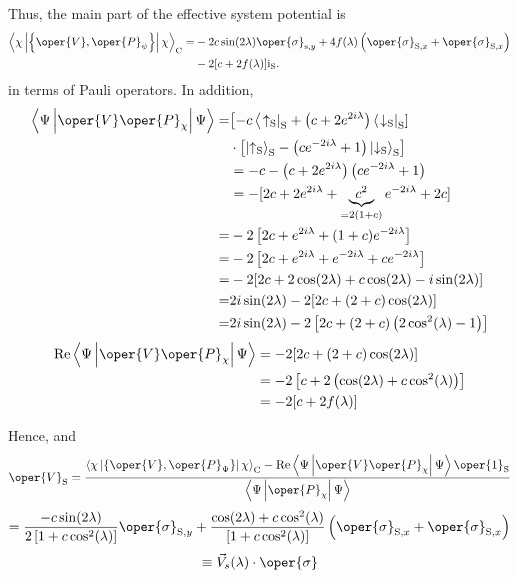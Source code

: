 Thus, the main part of the effective system potential is
$$
\begin{aligned}
\left\langle\chi\left|\left\{\oper{V}, \oper{P}_\psi\right\}\right| \chi\right\rangle_{\mathrm{C}}= & -2 c \sin (2 \lambda) \oper{\sigma}_{\mathrm{s}, y}+4 f(\lambda)\left(\oper{\sigma}_{\mathrm{S}, x}+\oper{\sigma}_{\mathrm{S}, x}\right) \\
& -2[c+2 f(\lambda)] \mathrm{i}_{\mathrm{S}} .
\end{aligned}
$$
in terms of Pauli operators. In addition,
$$
\begin{aligned}
\left\langle\Psi\left|\oper{V} \oper{P}_\chi\right| \Psi\right\rangle= & {\left[-c\left\langle\left.\uparrow_{\mathrm{S}}\right|_{\mathrm{S}}+\left(c+2 e^{2 i \lambda}\right)\left\langle\left.\downarrow_{\mathrm{S}}\right|_{\mathrm{S}}\right]\right.\right.} \\
& \cdot\left[\left|\uparrow_{\mathrm{S}}\right\rangle_{\mathrm{S}}-\left(c e^{-2 i \lambda}+1\right)\left|\downarrow_{\mathrm{S}}\right\rangle_{\mathrm{S}}\right] \\
& =-c-\left(c+2 e^{2 i \lambda}\right)\left(c e^{-2 i \lambda}+1\right) \\
& =-[2 c+2 e^{2 i \lambda}+\underbrace{c^2}_{=2(1+c)} e^{-2 i \lambda}+2 c] \\
= & -2\left[2 c+e^{2 i \lambda}+(1+c) e^{-2 i \lambda}\right] \\
= & -2\left[2 c+e^{2 i \lambda}+e^{-2 i \lambda}+c e^{-2 i \lambda}\right] \\
= & -2[2 c+2 \cos (2 \lambda)+c \cos (2 \lambda)-i \sin (2 \lambda)] \\
= & 2 i \sin (2 \lambda)-2[2 c+(2+c) \cos (2 \lambda)] \\
= & 2 i \sin (2 \lambda)-2\left[2 c+(2+c)\left(2 \cos ^2(\lambda)-1\right)\right]
\end{aligned}
$$
$$
\begin{aligned}
\operatorname{Re}\left\langle\Psi\left|\oper{V} \oper{P}_\chi\right| \Psi\right\rangle & =-2[2 c+(2+c) \cos (2 \lambda)] \\
& =-2\left[c+2\left(\cos (2 \lambda)+c \cos ^2(\lambda)\right)\right] \\
& =-2[c+2 f(\lambda)]
\end{aligned}
$$

Hence,
and
$$
\oper{V}_{\mathrm{S}}=\frac{\left\langle\chi\left|\left\{\oper{V}, \oper{P}_{\Psi}\right\}\right| \chi\right\rangle_{\mathrm{C}}-\operatorname{Re}\left\langle\Psi\left|\oper{V} \oper{P}_\chi\right| \Psi\right\rangle \oper{1}_{\mathrm{S}}}{\left\langle\Psi\left|\oper{P}_\chi\right| \Psi\right\rangle}
$$
$$
=\frac{-c \sin (2 \lambda)}{2\left[1+c \cos ^2(\lambda)\right]} \oper{\sigma}_{\mathrm{S}, y}+\frac{\cos (2 \lambda)+c \cos ^2(\lambda)}{\left[1+c \cos ^2(\lambda)\right]}\left(\oper{\sigma}_{\mathrm{S}, x}+\oper{\sigma}_{\mathrm{S}, x}\right)
$$
$$
\equiv \vec{V}_s(\lambda) \cdot \oper{\sigma}
$$
